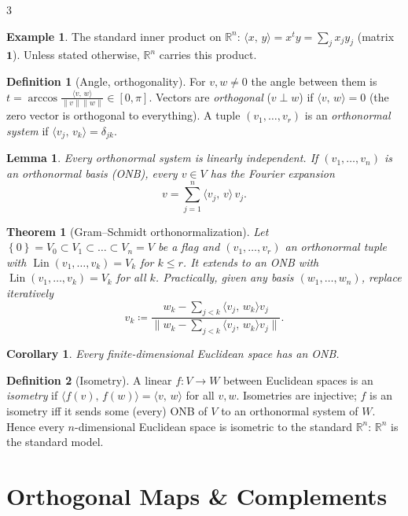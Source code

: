 \documentclass[10pt,a4paper,landscape]{article}
\theoremstyle{definition}
\newtheorem{defn}{Definition}[section]
\newtheorem{exm}{Example}[section]
\theoremstyle{plain}
\newtheorem{thm}{Theorem}[section]
\newtheorem{lem}{Lemma}[section]
\newtheorem{cor}{Corollary}[section]
\theoremstyle{remark}
\newcommand{\R}{\mathbb{R}}
\newcommand{\norm}[1]{\lVert #1 \rVert}
\newcommand{\set}[1]{\left\{ #1 \right\}}
\newcommand{\deq}{\coloneqq}
\DeclareMathOperator{\Lin}{Lin}
\newcommand{\ip}[2]{\langle #1,\, #2 \rangle}
\newcommand{\one}{\mathbf{1}}
\begin{document}
\begin{multicols*}{3}
\begin{exm}
The standard inner product on $\R^n$: $\ip{x}{y} = x^t y = \sum_j x_j y_j$ (matrix $\one$). Unless stated otherwise, $\R^n$ carries this product.
\end{exm}

\begin{defn}[Angle, orthogonality]
For $v, w \neq 0$ the angle between them is $t = \arccos \frac{\ip{v}{w}}{\norm{v}\norm{w}} \in [0, \pi]$. Vectors are \emph{orthogonal} ($v \perp w$) if $\ip{v}{w} = 0$ (the zero vector is orthogonal to everything). A tuple $(v_1, \dots, v_r)$ is an \emph{orthonormal system} if $\ip{v_j}{v_k} = \delta_{jk}$.
\end{defn}

\begin{lem}
Every orthonormal system is linearly independent. If $(v_1, \dots, v_n)$ is an \emph{orthonormal basis} (ONB), every $v \in V$ has the Fourier expansion
\[
v = \sum_{j=1}^n \ip{v_j}{v}\, v_j .
\]
\end{lem}

\begin{thm}[Gram--Schmidt orthonormalization]
Let $\set{0} = V_0 \subset V_1 \subset \dots \subset V_n = V$ be a flag and $(v_1, \dots, v_r)$ an orthonormal tuple with $\Lin(v_1, \dots, v_k) = V_k$ for $k \le r$. It extends to an ONB with $\Lin(v_1, \dots, v_k) = V_k$ for all $k$. Practically, given any basis $(w_1, \dots, w_n)$, replace iteratively
\[
v_k \deq \frac{w_k - \sum_{j<k} \ip{v_j}{w_k} v_j}{\norm{w_k - \sum_{j<k} \ip{v_j}{w_k} v_j}} .
\]
\end{thm}

\begin{cor}
Every finite-dimensional Euclidean space has an ONB.
\end{cor}

\begin{defn}[Isometry]
A linear $f: V \to W$ between Euclidean spaces is an \emph{isometry} if $\ip{f(v)}{f(w)} = \ip{v}{w}$ for all $v, w$. Isometries are injective; $f$ is an isometry iff it sends some (every) ONB of $V$ to an orthonormal system of $W$. Hence every $n$-dimensional Euclidean space is isometric to the standard $\R^n$: $\R^n$ is the standard model.
\end{defn}

\section{Orthogonal Maps \& Complements}


\end{multicols*}
\end{document}
